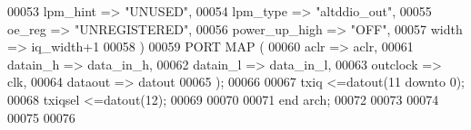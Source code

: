 \begin{DoxyCode}
00053         lpm\_hint                    => \textcolor{keyword}{"UNUSED"},
00054         lpm\_type                    => \textcolor{keyword}{"altddio\_out"},
00055         oe\_reg                      => \textcolor{keyword}{"UNREGISTERED"},
00056         power\_up\_high               => \textcolor{keyword}{"OFF"},
00057         width                       => iq\_width+1
00058     \textcolor{vhdlchar}{)}
00059     \textcolor{keywordflow}{PORT} \textcolor{keywordflow}{MAP} (
00060         aclr            => aclr,
00061         datain\_h    => data_in_h,
00062         datain\_l    => data_in_l,
00063         outclock    => clk,
00064         dataout         => datout
00065     \textcolor{vhdlchar}{)};
00066     
00067     \textcolor{vhdlchar}{txiq}        \textcolor{vhdlchar}{<=}\textcolor{vhdlchar}{datout}\textcolor{vhdlchar}{(}\textcolor{vhdllogic}{}\textcolor{vhdllogic}{11} \textcolor{keywordflow}{downto} \textcolor{vhdllogic}{}\textcolor{vhdllogic}{0}\textcolor{vhdlchar}{)};
00068     \textcolor{vhdlchar}{txiqsel} \textcolor{vhdlchar}{<=}\textcolor{vhdlchar}{datout}\textcolor{vhdlchar}{(}\textcolor{vhdllogic}{}\textcolor{vhdllogic}{12}\textcolor{vhdlchar}{)};
00069     
00070   
00071 \textcolor{keywordflow}{end} \textcolor{vhdlchar}{arch};   
00072 
00073 
00074 
00075 
00076 
\end{DoxyCode}

